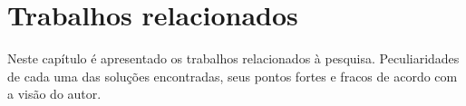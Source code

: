 \chapter{Trabalhos relacionados}\label{cap:trabalhos-relacionados}

Neste capítulo é apresentado os trabalhos relacionados à pesquisa. Peculiaridades
de cada uma das soluções encontradas, seus pontos fortes e fracos de acordo com
a visão do autor.


